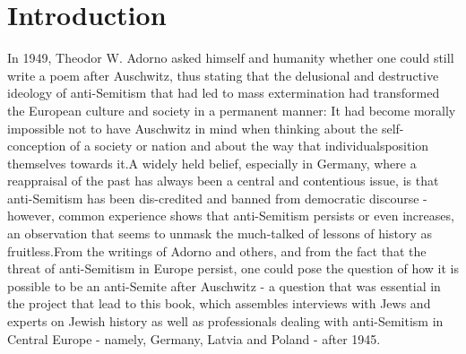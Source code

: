 \section{Introduction}
\vspace*{3em}
In 1949, Theodor W. Adorno asked himself and humanity whether one could still write a poem after Auschwitz, thus stating that the delusional and destructive ideology of anti-Semitism that had led to mass extermination had transformed the European culture and society in a permanent manner: It had become morally impossible not to have Auschwitz in mind when thinking about the self-conception of a society or nation and about the way that individualsposition themselves towards it.A widely held belief, especially in Germany, where a reappraisal of the past has always been a central and contentious issue, is that anti-Semitism has been dis-credited and banned from democratic discourse - however, common experience shows that anti-Semitism persists or even increases, an observation that seems to unmask the much-talked of lessons of history as fruitless.From the writings of Adorno and others, and from the fact that the threat of anti-Semitism in Europe persist, one could pose the question of how it is possible to be an anti-Semite after Auschwitz - a question that was essential in the project that lead to this book, which assembles interviews with Jews and experts on Jewish history as well as professionals dealing with anti-Semitism in Central Europe - namely, Germany, Latvia and Poland - after 1945.
